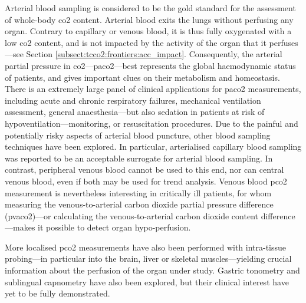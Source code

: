 Arterial blood sampling is considered to be the gold standard for the assessment of whole-body \gls{co2} content. Arterial blood exits the lungs without perfusing any organ. Contrary to capillary or venous blood, it is thus fully oxygenated with a low \gls{co2} content, and is not impacted by the activity of the organ that it perfuses\cite{kowalchuk1988, diaztagle2017}---see Section \ref{subsect:tcco2:frontiers:acc_impact}. Consequently, the arterial partial pressure in \gls{co2}---\gls{paco2}---best represents the global haemodynamic status of patients, and gives important clues on their metabolism and homeostasis\cite{larkin2015, wagner2015}. There is an extremely large panel of clinical applications for \gls{paco2} measurements, including acute and chronic respiratory failures\cite{foster1988, cukic2014}, mechanical ventilation assessment\cite{nava1994, tsuboi2010}, general anaesthesia---but also sedation in patients at risk of hypoventilation---monitoring\cite{campbell1994}, or resuscitation procedures\cite{schneider2013}. Due to the painful and potentially risky aspects of arterial blood puncture\cite{scheer2002}, other blood sampling techniques have been explored. In particular, arterialised capillary blood sampling was reported to be an acceptable surrogate for arterial blood sampling\cite{zavorsky2007}. In contrast, peripheral venous blood cannot be used to this end\cite{byrne2014}, nor can central venous blood\cite{malinoski2005, treger2010, walkey2010}, even if both may be used for trend analysis. Venous blood \gls{pco2} measurement is nevertheless interesting in critically ill patients, for whom measuring the venous-to-arterial carbon dioxide partial pressure difference (\gls{pvaco2})---or calculating the venous-to-arterial carbon dioxide content difference---makes it possible to detect organ hypo-perfusion\cite{scheeren2018}.


More localised \gls{pco2} measurements have also been performed with intra-tissue probing---in particular into the brain\cite{charbel2000}, liver\cite{brooks2007} or skeletal muscles\cite{mckinley1999}---yielding crucial information about the perfusion of the organ under study. Gastric tonometry and sublingual capnometry have also been explored, but their clinical interest have yet to be fully demonstrated\cite{mythen2015, mallat2018}.



